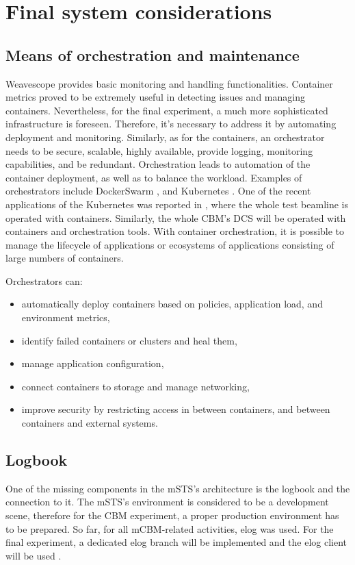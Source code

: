 \section{Final system considerations}
\subsection{Means of orchestration and maintenance} 
Weavescope provides basic monitoring and handling functionalities. Container metrics proved to be extremely useful in detecting issues and managing containers. Nevertheless, for the final experiment, a much more sophisticated infrastructure is foreseen. Therefore, it's necessary to address it by automating deployment and monitoring. Similarly, as for the containers, an orchestrator needs to be secure, scalable, highly available, provide logging, monitoring capabilities, and be redundant. Orchestration leads to automation of the container deployment, as well as to balance the workload. 
Examples of orchestrators include DockerSwarm \cite{DockerSwarm}, and Kubernetes \cite{Kubernetes}. One of the recent applications of the Kubernetes was reported in \cite{ICALEPCS2021:Diamond}, where the whole test beamline is operated with containers. Similarly, the whole CBM's DCS will be operated with containers and orchestration tools. 
With container orchestration, it is possible to manage the lifecycle of applications or ecosystems of applications consisting of large numbers of containers. 

Orchestrators can:
 \begin{itemize}
     \item automatically deploy containers based on policies, application load, and environment metrics,
     \item identify failed containers or clusters and heal them,
     \item manage application configuration,
     \item connect containers to storage and manage networking,
     \item improve security by restricting access in between containers, and between containers and external systems.
 \end{itemize}
\subsection{Logbook}
One of the missing components in the mSTS's architecture is the logbook and the connection to it. The mSTS's environment is considered to be a development scene, therefore for the CBM experiment, a proper production environment has to be prepared. So far, for all mCBM-related activities, elog \cite{elog} was used. For the final experiment, a dedicated elog branch will be implemented and the elog client will be used \cite{elog_client}.
